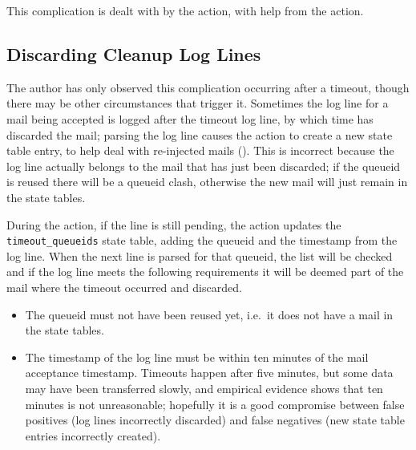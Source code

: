 This complication is dealt with by the  action, with help
from the  action.

\subsection{Discarding Cleanup Log Lines}

\label{discarding cleanup log lines}

The author has only observed this complication occurring after a timeout,
though there may be other circumstances that trigger it.  Sometimes the
 log line for a mail being accepted is logged after the
timeout log line, by which time \parsername{} has discarded the mail;
parsing the  log line causes the
 action to create a new state table entry, to
help deal with re-injected mails ().  This is
incorrect because the log line actually belongs to the mail that has just
been discarded; if the queueid is reused there will be a queueid clash,
otherwise the new mail will just remain in the state tables.

During the  action, if the  line is still
pending, the action updates the \texttt{timeout\_queueids} state table,
adding the queueid and the timestamp from the log line.  When the next
 line is parsed for that queueid, the list will be checked
and if the log line meets the following requirements it will be deemed part
of the mail where the timeout occurred and discarded.

\begin{itemize}

    \item The queueid must not have been reused yet, i.e.\ it does not have
        a mail in the state tables.

    \item The timestamp of the  log line must be within ten
        minutes of the mail acceptance timestamp.  Timeouts happen after
        five minutes, but some data may have been transferred slowly, and
        empirical evidence shows that ten minutes is not unreasonable;
        hopefully it is a good compromise between false positives (log
        lines incorrectly discarded) and false negatives (new state table
        entries incorrectly created).

\end{itemize}

